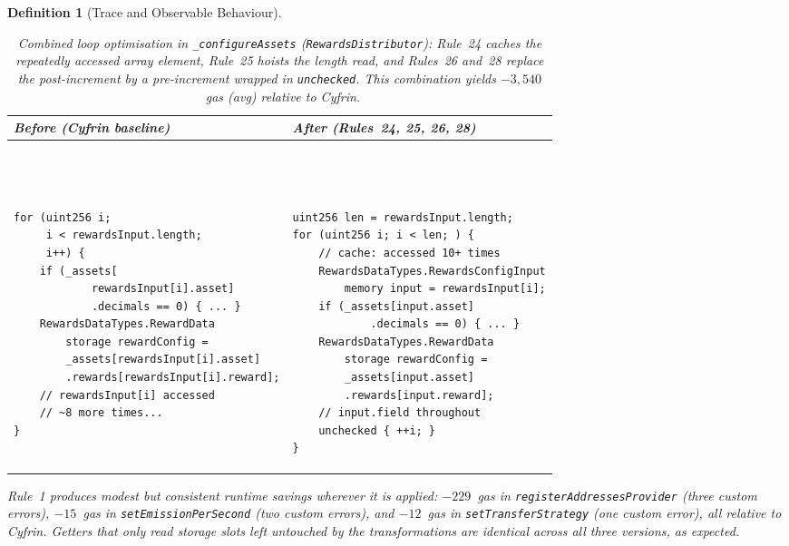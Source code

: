 \documentclass[manuscript,screen,review]{acmart}
\newtheorem{definition}{Definition}
\begin{document}
\begin{definition}[Trace and Observable Behaviour]
\begin{table}[htb]
\caption{Combined loop optimisation in \texttt{\_configureAssets}
  (\texttt{RewardsDistributor}): Rule~24 caches the repeatedly accessed array
  element, Rule~25 hoists the length read, and Rules~26 and~28 replace the
  post-increment by a pre-increment wrapped in \texttt{unchecked}. This
  combination yields $-3{,}540$~gas (avg) relative to Cyfrin.}
\label{tab:rule24_28_example}
\centering
\begin{footnotesize}
\begin{tabular}{|p{}|p{}|}
\hline
\rowcolor[HTML]{EFEFEF}
\textbf{Before (Cyfrin baseline)} & \textbf{After (Rules~24, 25, 26, 28)} \\ \hline
\vspace*{-0.5cm}
\begin{verbatim}



for (uint256 i;
     i < rewardsInput.length;
     i++) {
    if (_assets[
            rewardsInput[i].asset]
            .decimals == 0) { ... }
    RewardsDataTypes.RewardData
        storage rewardConfig =
        _assets[rewardsInput[i].asset]
        .rewards[rewardsInput[i].reward];
    // rewardsInput[i] accessed
    // ~8 more times...
}
\end{verbatim}
&
\vspace*{-0.5cm}
\begin{verbatim}



uint256 len = rewardsInput.length;
for (uint256 i; i < len; ) {
    // cache: accessed 10+ times
    RewardsDataTypes.RewardsConfigInput
        memory input = rewardsInput[i];
    if (_assets[input.asset]
            .decimals == 0) { ... }
    RewardsDataTypes.RewardData
        storage rewardConfig =
        _assets[input.asset]
        .rewards[input.reward];
    // input.field throughout
    unchecked { ++i; }
}
\end{verbatim}
\\ \hline
\end{tabular}
\end{footnotesize}
\end{table}

Rule~1 produces modest but consistent runtime savings wherever it is applied: $-229$~gas in \texttt{registerAddressesProvider} (three custom errors), $-15$~gas in \texttt{setEmissionPerSecond} (two custom errors), and $-12$~gas in \texttt{setTransferStrategy} (one custom error), all relative to Cyfrin. Getters that only read storage slots left untouched by the transformations are identical across all three versions, as expected.


\end{definition}
\end{document}

